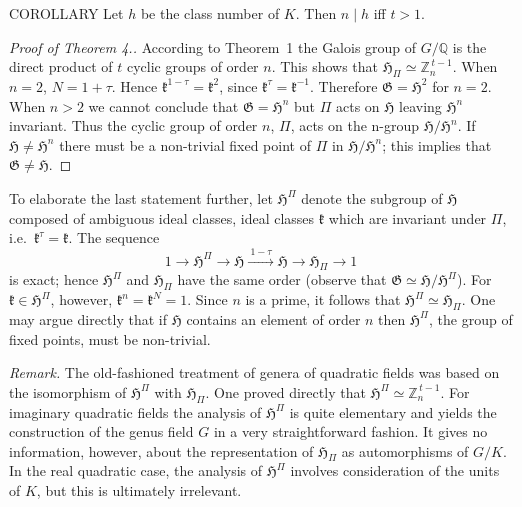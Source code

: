 \begin{namedstmt}{COROLLARY}
Let $h$ be the class number of $K$. Then $n\mid h$ iff $t>1$.
\end{namedstmt}

\begin{proof}[Proof of Theorem 4.]
According to Theorem~1 the Galois group of $G/\mathbb{Q}$ is the direct
product of $t$ cyclic groups of order $n$. This shows that
$\mathfrak{H}_{\Pi}\simeq\mathbb{Z}_{n}^{\,t-1}$. When $n=2$,
$N=1+\tau$. Hence $\mathfrak{k}^{1-\tau}=\mathfrak{k}^{2}$, since
$\mathfrak{k}^{\tau}=\mathfrak{k}^{-1}$. Therefore
$\mathfrak{G}=\mathfrak{H}^{2}$ for $n=2$. When $n>2$ we cannot conclude
that $\mathfrak{G}=\mathfrak{H}^{n}$ but $\Pi$ acts on $\mathfrak{H}$
leaving $\mathfrak{H}^{n}$ invariant. Thus the cyclic group of order
$n$, $\Pi$, acts on the n-group $\mathfrak{H}/\mathfrak{H}^{n}$. If
$\mathfrak{H}\neq\mathfrak{H}^{n}$ there must be a non-trivial fixed
point of $\Pi$ in $\mathfrak{H}/\mathfrak{H}^{n}$; this implies that
$\mathfrak{G}\neq\mathfrak{H}$.
\end{proof}

To elaborate the last statement further, let $\mathfrak{H}^{\Pi}$ denote
the subgroup of $\mathfrak{H}$ composed of ambiguous ideal classes,
ideal classes $\mathfrak{k}$ which are invariant under $\Pi$, i.e.\
$\mathfrak{k}^{\tau}=\mathfrak{k}$. The sequence
\[
1\longrightarrow\mathfrak{H}^{\Pi}\longrightarrow\mathfrak{H}
\xrightarrow{\ 1-\tau\ }\mathfrak{H}\longrightarrow\mathfrak{H}_{\Pi}
\longrightarrow 1
\]
is exact; hence $\mathfrak{H}^{\Pi}$ and $\mathfrak{H}_{\Pi}$ have the
same order (observe that $\mathfrak{G}\simeq
\mathfrak{H}/\mathfrak{H}^{\Pi}$). For
$\mathfrak{k}\in\mathfrak{H}^{\Pi}$, however,
$\mathfrak{k}^{n}=\mathfrak{k}^{N}=1$. Since $n$ is a prime, it follows
that $\mathfrak{H}^{\Pi}\simeq\mathfrak{H}_{\Pi}$. One may argue directly
that if $\mathfrak{H}$ contains an element of order $n$ then
$\mathfrak{H}^{\Pi}$, the group of fixed points, must be non-trivial.

\noindent\emph{Remark.} The old-fashioned treatment of genera of
quadratic fields was based on the isomorphism of $\mathfrak{H}^{\Pi}$
with $\mathfrak{H}_{\Pi}$. One proved directly that
$\mathfrak{H}^{\Pi}\simeq\mathbb{Z}_{n}^{\,t-1}$. For imaginary quadratic
fields the analysis of $\mathfrak{H}^{\Pi}$ is quite elementary and
yields the construction of the genus field $G$ in a very straightforward
fashion. It gives no information, however, about the representation of
$\mathfrak{H}_{\Pi}$ as automorphisms of $G/K$. In the real quadratic
case, the analysis of $\mathfrak{H}^{\Pi}$ involves consideration of the
units of $K$, but this is ultimately irrelevant.

